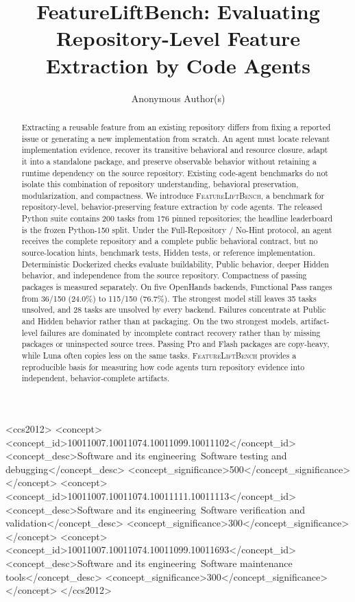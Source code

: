 \documentclass[acmsmall,anonymous,review,screen]{acmart}
\newcommand{\flb}{\textsc{FeatureLiftBench}\xspace}
\begin{document}
\title{FeatureLiftBench: Evaluating Repository-Level Feature Extraction by Code Agents}

\author{Anonymous Author(s)}
\renewcommand{\shortauthors}{Anonymous Author(s)}

\begin{abstract}
Extracting a reusable feature from an existing repository differs from fixing
a reported issue or generating a new implementation from scratch. An agent
must locate relevant implementation evidence, recover its transitive behavioral
and resource closure, adapt it into a standalone package, and preserve
observable behavior without retaining a runtime dependency on the source
repository. Existing code-agent benchmarks do not isolate this combination of
repository understanding, behavioral preservation, modularization, and
compactness. We introduce \flb, a benchmark for repository-level,
behavior-preserving feature extraction by code agents. The released Python
suite contains 200 tasks from 176 pinned repositories; the headline
leaderboard is the frozen Python-150 split. Under the Full-Repository /
No-Hint protocol, an agent receives the complete repository and a complete
public behavioral contract, but no source-location hints, benchmark tests,
Hidden tests, or reference implementation. Deterministic Dockerized checks
evaluate buildability, Public behavior, deeper Hidden behavior, and
independence from the source repository. Compactness of passing packages is
measured separately. On five OpenHands backends, Functional Pass ranges from
36/150 (24.0\%) to 115/150 (76.7\%). The strongest model still leaves 35
tasks unsolved, and 28 tasks are unsolved by every backend. Failures
concentrate at Public and Hidden behavior rather than at packaging. On the
two strongest models, artifact-level failures are dominated by incomplete
contract recovery rather than by missing packages or uninspected source
trees. Passing Pro and Flash packages are copy-heavy, while Luna often
copies less on the same tasks. \flb provides a reproducible basis for
measuring how code agents turn repository evidence into independent,
behavior-complete artifacts.
\end{abstract}

\begin{CCSXML}
<ccs2012>
 <concept>
  <concept_id>10011007.10011074.10011099.10011102</concept_id>
  <concept_desc>Software and its engineering~Software testing and debugging</concept_desc>
  <concept_significance>500</concept_significance>
 </concept>
 <concept>
  <concept_id>10011007.10011074.10011111.10011113</concept_id>
  <concept_desc>Software and its engineering~Software verification and validation</concept_desc>
  <concept_significance>300</concept_significance>
 </concept>
 <concept>
  <concept_id>10011007.10011074.10011099.10011693</concept_id>
  <concept_desc>Software and its engineering~Software maintenance tools</concept_desc>
  <concept_significance>300</concept_significance>
 </concept>
</ccs2012>
\end{CCSXML}
\end{document}
